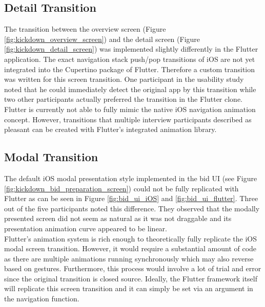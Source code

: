 \subsection{Detail Transition}
The transition between the overview screen (Figure \ref{fig:kickdown_overview_screen}) and the detail screen (Figure \ref{fig:kickdown_detail_screen}) was implemented slightly differently in the Flutter application.
The exact navigation stack push/pop transitions of iOS are not yet integrated into the Cupertino package of Flutter. Therefore a custom transition was written for this screen transition.
One participant in the usability study noted that he could immediately detect the original app by this transition while two other participants actually preferred the transition in the Flutter clone.
Flutter is currently not able to fully mimic the native iOS navigation animation concept. However, transitions that multiple interview participants described as pleasant can be created with Flutter's integrated animation library.

\subsection{Modal Transition}
The default iOS modal presentation style implemented in the bid UI (see Figure \ref{fig:kickdown_bid_preparation_screen}) could not be fully replicated with Flutter as can be seen in Figure \ref{fig:bid_ui_iOS} and \ref{fig:bid_ui_flutter}.
Three out of the five participants noted this difference. 
They observed that the modally presented screen did not seem as natural as it was not draggable and its presentation animation curve appeared to be linear.\\
Flutter's animation system is rich enough to theoretically fully replicate the iOS modal screen transition. However, it would require a substantial amount of code as there are multiple animations 
running synchronously which may also reverse based on gestures. Furthermore, this process would involve a lot of trial and error since the original transition is closed source.
Ideally, the Flutter framework itself will replicate this screen transition and it can simply be set via an argument in the navigation function.

